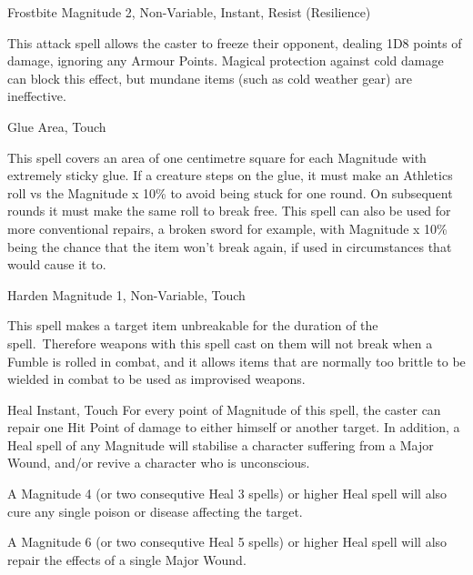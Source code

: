 \begin{rpg-spell}
{Frostbite}
{Magnitude 2, Non-Variable, Instant, Resist (Resilience)}

This attack spell allows the caster to freeze their opponent, dealing 1D8 points of damage, ignoring any Armour Points. Magical protection against cold damage can block this effect, but mundane items (such as cold weather gear) are ineffective.
\end{rpg-spell}


\begin{rpg-spell}
{Glue}
{Area, Touch}

This spell covers an area of one centimetre square for each Magnitude with extremely sticky glue. If a creature steps on the glue, it must make an Athletics roll vs the Magnitude x 10\% to avoid being stuck for one round. On subsequent rounds it must make the same roll to break free. This spell can also be used for more conventional repairs, a broken sword for example, with Magnitude x 10\% being the chance that the item won’t break again, if used in circumstances that would cause it to.
\end{rpg-spell}


%


\begin{rpg-spell}
{Harden}
{Magnitude 1, Non-Variable, Touch}

This spell makes a target item unbreakable for the duration of the spell. Therefore weapons with this spell cast on them will not break when a Fumble is rolled in combat, and it allows items that are normally too brittle to be wielded in combat to be used as improvised weapons.
\end{rpg-spell}


\begin{rpg-spell}
{Heal}
{Instant, Touch}
For every point of Magnitude of this spell, the caster can repair one Hit Point of damage to either himself or another target. In addition, a Heal spell of any Magnitude will stabilise a character suffering from a Major Wound, and/or revive a character who is unconscious. 

A Magnitude 4 (or two consequtive Heal 3 spells) or higher Heal spell will also cure any single poison or disease affecting the target. 

A Magnitude 6 (or two consequtive Heal 5 spells) or higher Heal spell will also repair the effects of a single Major Wound.
\end{rpg-spell}


